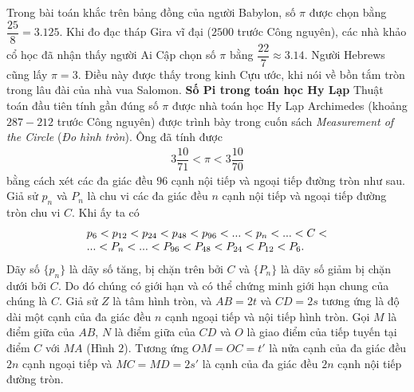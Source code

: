 \begin{multicols}{2}

	Trong bài toán khắc trên bảng đồng của người Babylon, số $\pi$  được chọn bằng $\dfrac{{25}}{8} = 3.125$.
	\vskip 0.1cm   
	Khi đo đạc tháp Gira vĩ đại ($2500$ trước Công nguyên), các nhà khảo cổ học đã nhận thấy người Ai Cập chọn số $\pi$  bằng $\dfrac{{22}}{7} \approx 3.14$.
	\vskip 0.1cm   
	Người Hebrews cũng lấy $\pi = 3$.  Điều này được thấy trong kinh Cựu ước, khi nói về bồn tắm tròn trong lâu đài của nhà vua Salomon. 
	\vskip 0.1cm
	\textbf{\color{lichsutoanhoc}Số Pi trong toán học Hy Lạp}
	\vskip 0.1cm
	Thuật toán đầu tiên tính gần đúng số $\pi$  được nhà toán học Hy Lạp Archimedes (khoảng $287-212$ trước Công nguyên) được trình bày trong cuốn sách  \textit{Measurement of the Circle} (\textit{Đo hình tròn}). Ông  đã tính được 
	\begin{align*}
		3\dfrac{{10}}{{71}} < \pi  < 3\dfrac{{10}}{{70}} \tag{$1$}
	\end{align*}
	bằng cách xét các đa giác đều $96$ cạnh nội tiếp và ngoại tiếp đường tròn như sau. 
	\vskip 0.1cm
	Giả sử $p_n$  và  $P_n$ là chu vi các đa giác đều $n$  cạnh nội tiếp và ngoại tiếp đường tròn chu vi $C$.  Khi ấy ta có 
	\begin{align*}
		\begin{array}{l}
			{p_6} < {p_{12}} < {p_{24}} < {p_{48}} < {\rm{ }}{p_{96}} < ... < {p_n} < ... < C < \\
			... < {P_n} < ... < {P_{96}} < {P_{48}} < {P_{24}} < {P_{12}} < {P_6}.
		\end{array}
	\end{align*}
	Dãy số $\{p_n\}$  là dãy số tăng, bị chặn trên bởi $C$  và $\{P_n\}$  là dãy số giảm bị chặn dưới bởi $C$.  Do đó chúng có giới hạn và có thể chứng minh giới hạn chung của chúng là  $C$.
	\vskip 0.1cm
	Giả sử  $Z$ là tâm hình tròn, và $AB = 2t$  và $CD = 2s$   tương ứng là độ dài một cạnh của đa giác đều $n$  cạnh ngoại tiếp và nội tiếp hình tròn. Gọi $M$  là điểm giữa của $AB$, $N$ là điểm giữa của  $CD$ và $O$  là giao điểm của tiếp tuyến tại điểm  $C$ với $MA$  (Hình $2$). Tương ứng $OM = OC = t'$  là nửa cạnh của đa giác đều $2n$  cạnh ngoại tiếp và $MC = MD = 2s'$ là cạnh của đa giác đều $2n$ cạnh nội tiếp đường tròn.     
	


\end{multicols}
